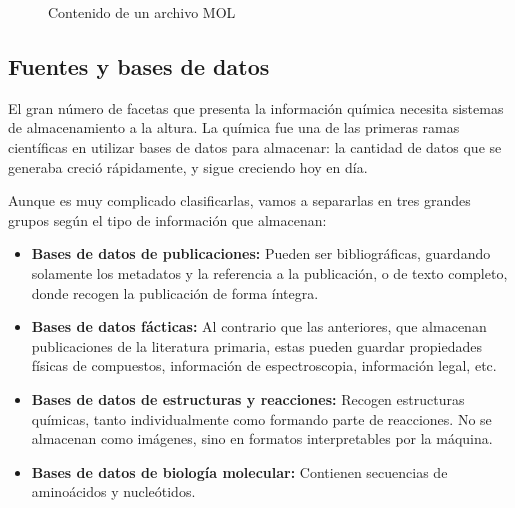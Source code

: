 \begin{figure}[H]
\centering
    \caption{Contenido de un archivo MOL \cite{molfile_example}} 
\end{figure}


\subsection{Fuentes y bases de datos}

El gran número de facetas que presenta la información química necesita sistemas de almacenamiento a la altura. La química fue una de las primeras ramas científicas en utilizar bases de datos para almacenar: la cantidad de datos que se generaba creció rápidamente, y sigue creciendo hoy en día. 

Aunque es muy complicado clasificarlas, vamos a separarlas en tres grandes grupos según el tipo de información que almacenan: \cite{doi:10.1021/ci600234z}
\begin{itemize}
    \item \textbf{Bases de datos de publicaciones:} Pueden ser bibliográficas, guardando solamente los metadatos y la referencia a la publicación, o de texto completo, donde recogen la publicación de forma íntegra. %
    \item \textbf{Bases de datos fácticas:} Al contrario que las anteriores, que almacenan publicaciones de la literatura primaria, estas pueden guardar propiedades físicas de compuestos, información de espectroscopia, información legal, etc.
    \item \textbf{Bases de datos de estructuras y reacciones:} Recogen estructuras químicas, tanto individualmente como formando parte de reacciones. No se almacenan como imágenes, sino en formatos interpretables por la máquina.
    \item \textbf{Bases de datos de biología molecular:} Contienen secuencias de aminoácidos y nucleótidos.
\end{itemize}

